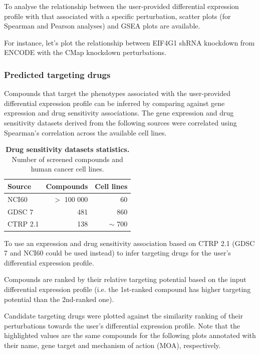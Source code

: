 To analyse the relationship between the user-provided differential expression profile with that associated with a specific perturbation, scatter plots (for Spearman and Pearson analyses) and GSEA plots are available.

For instance, let’s plot the relationship between EIF4G1 shRNA knockdown from ENCODE with the CMap knockdown perturbations.

\subsubsection{Predicted targeting drugs}

Compounds that target the phenotypes associated with the user-provided differential expression profile can be inferred by comparing against gene expression and drug sensitivity associations. The gene expression and drug sensitivity datasets derived from the following sources were correlated using Spearman’s correlation across the available cell lines.

\begin{table}
\centering
\parnotereset
\small
\caption[Drug sensitivity datasets statistics]{\textbf{Drug sensitivity datasets statistics.} Number of screened compounds and human cancer cell lines.}
\label{tab:drug-sensitivity-datasets}
\begin{tabularx}{.47\textwidth}{ l r r }
\toprule
\textbf{Source}   & \textbf{Compounds} & \textbf{Cell lines} \\
\midrule
NCI60             &                   $>$ 100 000 & 60 \\
GDSC 7            &                           481 & 860 \\
CTRP 2.1          &                           138 & $\sim$ 700 \\
\bottomrule
\end{tabularx}
\parnotes
\end{table}

To use an expression and drug sensitivity association based on CTRP 2.1 (GDSC 7 and NCI60 could be used instead) to infer targeting drugs for the user’s differential expression profile.

Compounds are ranked by their relative targeting potential based on the input differential expression profile (i.e. the 1st-ranked compound has higher targeting potential than the 2nd-ranked one).

Candidate targeting drugs were plotted against the similarity ranking of their perturbations towards the user’s differential expression profile. Note that the highlighted values are the same compounds for the following plots annotated with their name, gene target and mechanism of action (MOA), respectively.

